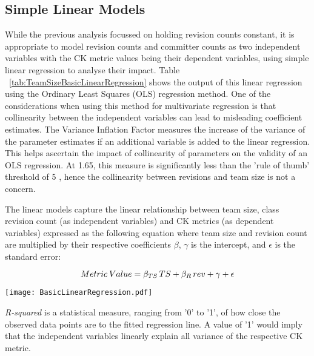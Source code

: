 \subsection{Simple Linear Models}
While the previous analysis focussed on holding revision counts constant, it is appropriate to model revision counts and committer counts as two independent variables with the CK metric values being their dependent variables, using simple linear regression to analyse their impact. Table ~\ref{tab:TeamSizeBasicLinearRegression} shows the output of this linear regression using the Ordinary Least Squares (OLS) regression method. One of the considerations when using this method for multivariate regression is that collinearity between the independent variables can lead to misleading coefficient estimates. The Variance Inflation Factor measures the increase of the variance of the parameter estimates if an additional variable is added to the linear regression. This helps ascertain the impact of collinearity of parameters on the validity of an OLS regression. At 1.65, this measure is significantly less than the 'rule of thumb' threshold of 5 \citep{menard2002applied}, hence the collinearity between revisions and team size is not a concern.

The linear models capture the linear relationship between team size, class revision count (as independent variables) and CK metrics (as dependent variables) expressed as the following equation where team size and revision count are multiplied by their respective coefficients $\beta$, $\gamma$ is the intercept, and $\epsilon$ is the standard error:

\[\large Metric \: Value = \beta_{TS}\, TS +  \beta_{R}\, rev +  \gamma + \epsilon \]

\begin{table}
\centering 
{}
\begin{tabular}
 \centering 
 \texttt{[image: BasicLinearRegression.pdf]}
 \label{tab:TeamSizeBasicLinearRegression}
\end{tabular}
\end{table}

\textit{R-squared} is a statistical measure, ranging from '0' to '1', of how close the observed data points are to the fitted regression line. A value of '1' would imply that the independent variables linearly explain all variance of the respective CK metric.

